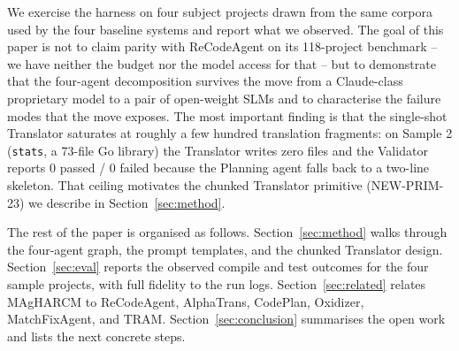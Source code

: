 We exercise the harness on four subject projects drawn from the same
corpora used by the four baseline systems and report what we observed. The
goal of this paper is not to claim parity with ReCodeAgent on its 118-project
benchmark -- we have neither the budget nor the model access for that -- but
to demonstrate that the four-agent decomposition survives the move from a
Claude-class proprietary model to a pair of open-weight SLMs and to
characterise the failure modes that the move exposes. The most important
finding is that the single-shot Translator saturates at roughly a few
hundred translation fragments: on Sample 2 (\texttt{stats}, a 73-file Go
library) the Translator writes zero files and the Validator reports
0 passed / 0 failed because the Planning agent falls back to a two-line
skeleton. That ceiling motivates the chunked Translator primitive
(NEW-PRIM-23) we describe in Section~\ref{sec:method}.

The rest of the paper is organised as follows.
Section~\ref{sec:method} walks through the four-agent graph, the prompt
templates, and the chunked Translator design.
Section~\ref{sec:eval} reports the observed compile and test outcomes for
the four sample projects, with full fidelity to the run logs.
Section~\ref{sec:related} relates MAgHARCM to ReCodeAgent, AlphaTrans,
CodePlan, Oxidizer, MatchFixAgent, and TRAM.
Section~\ref{sec:conclusion} summarises the open work and lists the next
concrete steps.
